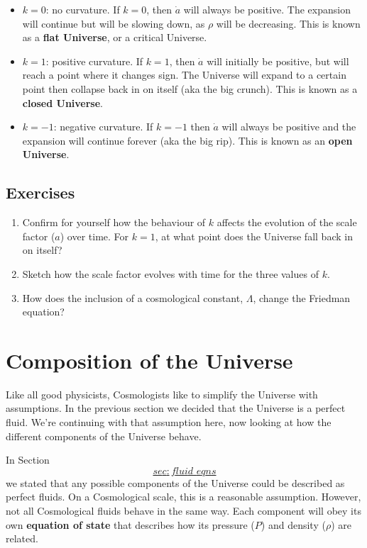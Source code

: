 \documentclass[]{book}
\begin{document}
\begin{itemize}
\item
  \(k = 0\): no curvature. If \(k=0\), then \(\dot{a}\) will always be
  positive. The expansion will continue but will be slowing down, as
  \(\rho\) will be decreasing. This is known as a \textbf{flat Universe}, or
  a critical Universe.
\item
  \(k = 1\): positive curvature. If \(k = 1\), then \(\dot{a}\) will
  initially be positive, but will reach a point where it changes sign.
  The Universe will expand to a certain point then collapse back in on
  itself (aka the big crunch). This is known as a \textbf{closed Universe}.
\item
  \(k = -1\): negative curvature. If \(k=-1\) then \(\dot{a}\) will always
  be positive and the expansion will continue forever (aka the big
  rip). This is known as an \textbf{open Universe}.
\end{itemize}

\hypertarget{sec:geometry_ex}{%
\section{Exercises}\label{sec:geometry_ex}}

\begin{enumerate}
\def\labelenumi{\arabic{enumi}.}
\item
  Confirm for yourself how the behaviour of \(k\) affects the evolution
  of the scale factor (\(a\)) over time. For \(k=1\), at what point does
  the Universe fall back in on itself?
\item
  Sketch how the scale factor evolves with time for the three values
  of \(k\).
\item
  How does the inclusion of a cosmological constant, \(\Lambda\), change
  the Friedman equation?
\end{enumerate}

\hypertarget{ch:constituents}{%
\chapter{Composition of the Universe}\label{ch:constituents}}

Like all good physicists, Cosmologists like to simplify the Universe
with assumptions. In the previous section we decided that the Universe
is a perfect fluid. We're continuing with that assumption here, now
looking at how the different components of the Universe behave.

In Section~\protect\hyperlink{sec:fluid_eqns}{\[sec:fluid\_eqns\]} we stated that any possible components of
the Universe could be described as perfect fluids. On a Cosmological
scale, this is a reasonable assumption. However, not all Cosmological
fluids behave in the same way. Each component will obey its own
\textbf{equation of state} that describes how its pressure (\(P\)) and density
(\(\rho\)) are related.
\end{document}

